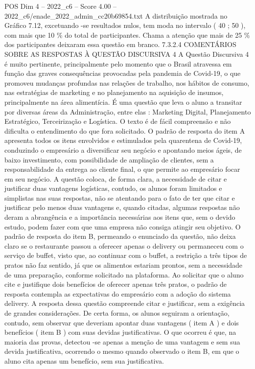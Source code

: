 \begin{textsample}{POS Dim 4 – 2022\_c6 – Score 4.00 – 2022\_c6/enade\_2022\_admin\_cc20b69854.txt}
A distribuição mostrada no Gráfico 7.12, excetuando -se resultados nulos, tem moda no intervalo ( 40 ; 50 ), com mais que 10 \% do total de participantes.
Chama a atenção que mais de 25 \% dos participantes deixaram essa questão em branco. 7.3.2.4 COMENTÁRIOS SOBRE AS RESPOSTAS À QUESTÃO DISCURSIVA 4 A Questão Discursiva 4 é muito pertinente, principalmente pelo momento que o Brasil atravessa em função das graves consequências provocadas pela pandemia de Covid-19, o que promoveu mudanças profundas nas relações de trabalho, nos hábitos de consumo, nas estratégias de marketing e no planejamento na aquisição de insumos, principalmente na área alimentícia.
É uma questão que leva o aluno a transitar por diversas áreas da Administração, entre elas : Marketing Digital, Planejamento Estratégico, Terceirização e Logística.
O texto é de fácil compreensão e não dificulta o entendimento do que fora solicitado.
O padrão de resposta do item A apresenta todos os itens envolvidos e estimulados pela quarentena de Covid-19, conduzindo o empresário a diversificar seu negócio e apontando meios ágeis, de baixo investimento, com possibilidade de ampliação de clientes, sem a responsabilidade da entrega ao cliente final, o que permite ao empresário focar em seu negócio.
A questão coloca, de forma clara, a necessidade de citar e justificar duas vantagens logísticas, contudo, os alunos foram limitados e simplistas nas suas respostas, não se atentando para o fato de ter que citar e justificar pelo menos duas vantagens e, quando citadas, algumas respostas não deram a abrangência e a importância necessárias aos itens que, sem o devido estudo, podem fazer com que uma empresa não consiga atingir seu objetivo.
O padrão de resposta do item B, permeando o enunciado da questão, não deixa claro se o restaurante passou a oferecer apenas o delivery ou permaneceu com o serviço de buffet, visto que, ao continuar com o buffet, a restrição a três tipos de pratos não faz sentido, já que os alimentos estariam prontos, sem a necessidade de uma preparação, conforme solicitado na plataforma.
Ao solicitar que o aluno cite e justifique dois benefícios de oferecer apenas três pratos, o padrão de resposta contempla as expectativas do empresário com a adoção do sistema delivery.
A resposta dessa questão compreende citar e justificar, sem a exigência de grandes considerações.
De certa forma, os alunos seguiram a orientação, contudo, sem observar que deveriam apontar duas vantagens ( item A ) e dois benefícios ( item B ) com suas devidas justificativas.
O que ocorreu é que, na maioria das provas, detectou -se apenas a menção de uma vantagem e sem sua devida justificativa, ocorrendo o mesmo quando observado o item B, em que o aluno cita apenas um benefício, sem sua justificativa.

\end{textsample}
